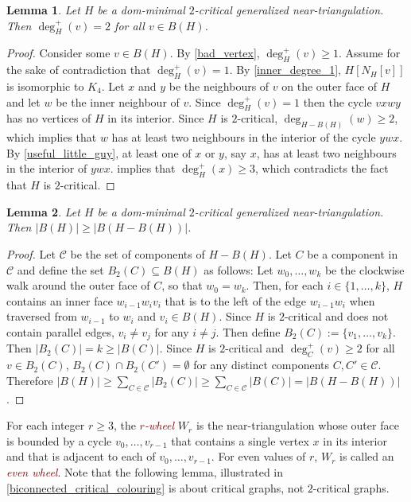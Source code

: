 \documentclass{article}
\newtheorem{lem}{Lemma}
\newcommand{\defin}[1]{\emph{\textcolor{Maroon}{#1}}}
\theoremstyle{definition}
\begin{document}
\begin{lem}
  Let $H$ be a dom-minimal $2$-critical generalized near-triangulation.  Then $\deg^+_H(v)=2$ for all $v\in B(H)$.
\end{lem}

\begin{proof}
  Consider some $v\in B(H)$. By \cref{bad_vertex}, $\deg^+_H(v)\ge 1$. Assume for the sake of contradiction that $\deg^+_H(v)=1$. By \cref{inner_degree_1}, $H[N_H[v]]$ is isomorphic to $K_4$. Let $x$ and $y$ be the neighbours of $v$ on the outer face of $H$ and let $w$ be the inner neighbour of $v$. Since $\deg^+_H(v)=1$ then the cycle $vxwy$ has no vertices of $H$ in its interior.  Since $H$ is $2$-critical, $\deg_{H-B(H)}(w)\ge 2$, which implies that $w$ has at least two neighbours in the interior of the cycle $ywx$.  By \cref{useful_little_guy}, at least one of $x$ or $y$, say $x$, has at least two neighbours in the interior of $ywx$.   implies that $\deg^+_H(x)\ge 3$, which contradicts the fact that $H$ is $2$-critical.
\end{proof}


\begin{lem}\label{two_critical_boundary_size}
  Let $H$ be a dom-minimal $2$-critical generalized near-triangulation.  Then $|B(H)|\ge |B(H-B(H))|$.
\end{lem}

\begin{proof}
  Let $\mathcal{C}$ be the set of components of $H-B(H)$.
  Let $C$ be a component in $\mathcal{C}$ and define the set $B_2(C)\subseteq B(H)$ as follows: Let $w_0,\ldots,w_k$ be the clockwise walk around the outer face of $C$, so that $w_0=w_k$.  Then, for each $i\in\{1,\ldots,k\}$, $H$ contains an inner face $w_{i-1}w_iv_i$ that is to the left of the edge $w_{i-1}w_i$ when traversed from $w_{i-1}$ to $w_i$ and $v_i\in B(H)$.  Since $H$ is $2$-critical and does not contain parallel edges, $v_i\neq v_j$ for any $i\neq j$. Then define $B_2(C):=\{v_1,\ldots,v_k\}$.  Then $|B_2(C)|= k\ge |B(C)|$. Since $H$ is $2$-critical and $\deg^+_C(v)\ge 2$ for all $v\in B_2(C)$, $B_2(C)\cap B_2(C')=\emptyset$ for any distinct components $C,C'\in\mathcal{C}$.  Therefore $|B(H)|\ge \sum_{C\in\mathcal{C}} |B_2(C)|\ge \sum_{C\in\mathcal{C}} |B(C)|=|B(H-B(H))|$.
\end{proof}

For each integer $r\ge 3$, the \defin{$r$-wheel} $W_r$ is the near-triangulation whose outer face is bounded by a cycle $v_0,\ldots,v_{r-1}$ that contains a single vertex $x$ in its interior and that is adjacent to each of $v_0,\ldots,v_{r-1}$.  For even values of $r$, $W_r$ is called an \defin{even wheel}. Note that the following lemma, illustrated in \cref{biconnected_critical_colouring} is about critical graphs, not $2$-critical graphs.
\end{document}
